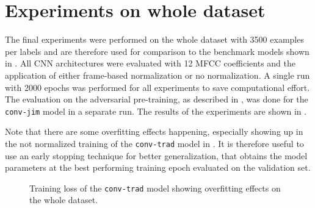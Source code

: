 
\section{Experiments on whole dataset}\label{sec:exp_final}
\thesisStateRevised
The final experiments were performed on the whole dataset with 3500 examples per labels and are therefore used for comparison to the benchmark models shown in .
All CNN architectures were evaluated with 12 MFCC coefficients and the application of either frame-based normalization or no normalization.
A single run with 2000 epochs was performed for all experiments to save computational effort.
The evaluation on the adversarial pre-training, as described in , was done for the \texttt{conv-jim} model in a separate run.
The results of the experiments are shown in .

Note that there are some overfitting effects happening, especially showing up in the not normalized training of the \texttt{conv-trad} model in .
It is therefore useful to use an early stopping technique for better generalization, that obtains the model parameters at the best performing training epoch evaluated on the validation set.
\begin{figure}[!ht]
  \centering
  \caption{Training loss of the \texttt{conv-trad} model showing overfitting effects on the whole dataset.}
  \label{fig:exp_final_loss_conv-trad}
\end{figure}
